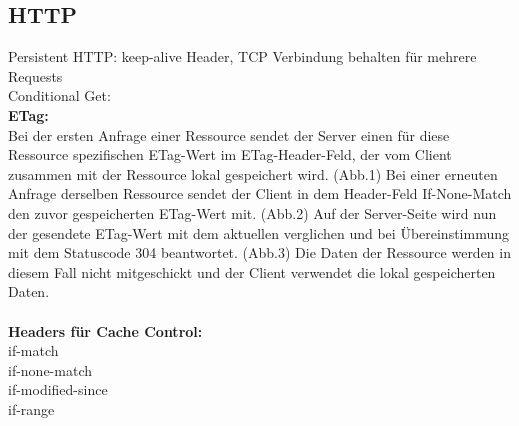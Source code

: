 \subsection{HTTP}
Persistent HTTP: keep-alive Header, TCP Verbindung behalten für mehrere Requests\\
Conditional Get: \\
\textbf{ETag:} \\Bei der ersten Anfrage einer Ressource sendet der Server einen für diese Ressource spezifischen ETag-Wert im ETag-Header-Feld, der vom Client zusammen mit der Ressource lokal gespeichert wird. (Abb.1) Bei einer erneuten Anfrage derselben Ressource sendet der Client in dem Header-Feld If-None-Match den zuvor gespeicherten ETag-Wert mit. (Abb.2) Auf der Server-Seite wird nun der gesendete ETag-Wert mit dem aktuellen verglichen und bei Übereinstimmung mit dem Statuscode 304 beantwortet. (Abb.3) Die Daten der Ressource werden in diesem Fall nicht mitgeschickt und der Client verwendet die lokal gespeicherten Daten.\\\\
\textbf{Headers für Cache Control:}\\
if-match\\
if-none-match\\
if-modified-since\\
if-range\\\\


